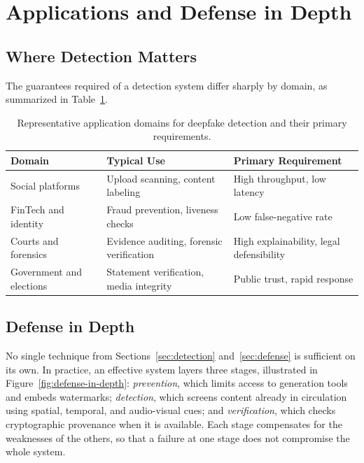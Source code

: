\documentclass[a4paper,12pt]{article}
\begin{document}
\section{Applications and Defense in Depth}
\label{sec:applications}

\subsection{Where Detection Matters}
\label{subsec:where}

The guarantees required of a detection system differ sharply by domain, as summarized in Table~\ref{tab:applications}.

\begin{table}[H]
    \centering
    \renewcommand{\arraystretch}{1.3}
    \begin{tabular}{@{} >{\raggedright\arraybackslash}p{3.6cm} >{\raggedright\arraybackslash}p{5.5cm} >{\raggedright\arraybackslash}p{5.5cm} @{}}
        \toprule
        \rowcolor{gray!15}
        \textbf{Domain} & \textbf{Typical Use} & \textbf{Primary Requirement} \\
        \midrule
        Social platforms & Upload scanning, content labeling & High throughput, low latency \\
        \midrule
        FinTech and identity & Fraud prevention, liveness checks & Low false-negative rate \\
        \midrule
        Courts and forensics & Evidence auditing, forensic verification & High explainability, legal defensibility \\
        \midrule
        Government and elections & Statement verification, media integrity & Public trust, rapid response \\
        \bottomrule
    \end{tabular}
    \caption{Representative application domains for deepfake detection and their primary requirements.}
    \label{tab:applications}
\end{table}

\subsection{Defense in Depth}
\label{subsec:defense-in-depth}

No single technique from Sections~\ref{sec:detection} and~\ref{sec:defense} is sufficient on its own. In practice, an effective system layers three stages, illustrated in Figure~\ref{fig:defense-in-depth}: \textit{prevention}, which limits access to generation tools and embeds watermarks; \textit{detection}, which screens content already in circulation using spatial, temporal, and audio-visual cues; and \textit{verification}, which checks cryptographic provenance when it is available. Each stage compensates for the weaknesses of the others, so that a failure at one stage does not compromise the whole system.
\end{document}
